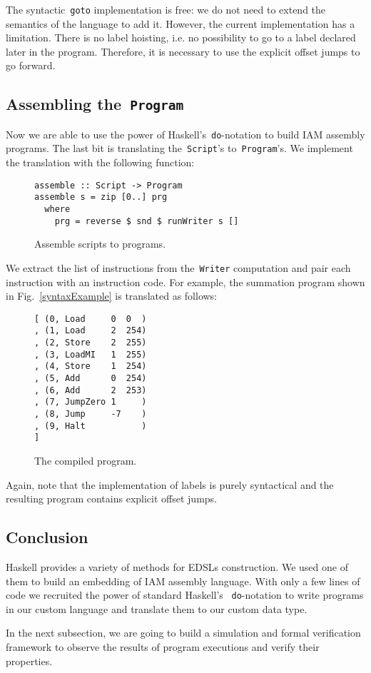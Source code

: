 The syntactic~\texttt{goto} implementation is free: we do not need
to extend the semantics of the language to add it. However, the current implementation
has a limitation. There is no label hoisting, i.e. no possibility to go to a label
declared later in the program. Therefore, it is necessary to use the explicit offset
jumps to go forward.

\subsection{Assembling the~\texttt{Program}}

Now we are able to use the power of Haskell's~\texttt{do}-notation to
build IAM assembly programs. The last bit is translating
the~\texttt{Script}'s to~\texttt{Program}'s. We implement the
translation with the following function:

\begin{figure}[H]
\begin{verbatim}
assemble :: Script -> Program
assemble s = zip [0..] prg
  where
    prg = reverse $ snd $ runWriter s []
\end{verbatim}
\caption{Assemble scripts to programs.}
\end{figure}

We extract the list of instructions from the~\texttt{Writer} computation
and pair each instruction with an instruction code. For example, the summation
program shown in Fig.~\ref{syntaxExample} is translated as follows:

\begin{figure}[H]
\begin{verbatim}
[ (0, Load     0  0  )
, (1, Load     2  254)
, (2, Store    2  255)
, (3, LoadMI   1  255)
, (4, Store    1  254)
, (5, Add      0  254)
, (6, Add      2  253)
, (7, JumpZero 1     )
, (8, Jump     -7    )
, (9, Halt           )
]
\end{verbatim}
\caption{The compiled program.}
\end{figure}

Again, note that the implementation of labels is purely syntactical and the
resulting program contains explicit offset jumps.

\subsection{Conclusion}

Haskell provides a variety of methods for EDSLs construction.
We used one of them to build an embedding of IAM assembly language.
With only a few lines of code we recruited the power of standard Haskell's
~\texttt{do}-notation to write programs in our custom language and
translate them to our custom data type.

In the next subsection, we are going to build a simulation and formal verification
framework to observe the results of program executions and verify their properties.